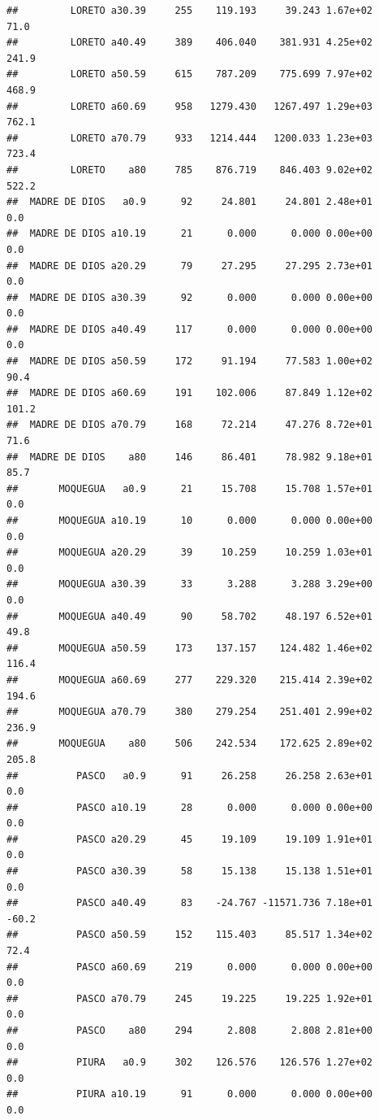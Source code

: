 \documentclass[
]{article}
\begin{document}
\begin{verbatim}
##         LORETO a30.39     255    119.193     39.243 1.67e+02       71.0
##         LORETO a40.49     389    406.040    381.931 4.25e+02      241.9
##         LORETO a50.59     615    787.209    775.699 7.97e+02      468.9
##         LORETO a60.69     958   1279.430   1267.497 1.29e+03      762.1
##         LORETO a70.79     933   1214.444   1200.033 1.23e+03      723.4
##         LORETO    a80     785    876.719    846.403 9.02e+02      522.2
##  MADRE DE DIOS   a0.9      92     24.801     24.801 2.48e+01        0.0
##  MADRE DE DIOS a10.19      21      0.000      0.000 0.00e+00        0.0
##  MADRE DE DIOS a20.29      79     27.295     27.295 2.73e+01        0.0
##  MADRE DE DIOS a30.39      92      0.000      0.000 0.00e+00        0.0
##  MADRE DE DIOS a40.49     117      0.000      0.000 0.00e+00        0.0
##  MADRE DE DIOS a50.59     172     91.194     77.583 1.00e+02       90.4
##  MADRE DE DIOS a60.69     191    102.006     87.849 1.12e+02      101.2
##  MADRE DE DIOS a70.79     168     72.214     47.276 8.72e+01       71.6
##  MADRE DE DIOS    a80     146     86.401     78.982 9.18e+01       85.7
##       MOQUEGUA   a0.9      21     15.708     15.708 1.57e+01        0.0
##       MOQUEGUA a10.19      10      0.000      0.000 0.00e+00        0.0
##       MOQUEGUA a20.29      39     10.259     10.259 1.03e+01        0.0
##       MOQUEGUA a30.39      33      3.288      3.288 3.29e+00        0.0
##       MOQUEGUA a40.49      90     58.702     48.197 6.52e+01       49.8
##       MOQUEGUA a50.59     173    137.157    124.482 1.46e+02      116.4
##       MOQUEGUA a60.69     277    229.320    215.414 2.39e+02      194.6
##       MOQUEGUA a70.79     380    279.254    251.401 2.99e+02      236.9
##       MOQUEGUA    a80     506    242.534    172.625 2.89e+02      205.8
##          PASCO   a0.9      91     26.258     26.258 2.63e+01        0.0
##          PASCO a10.19      28      0.000      0.000 0.00e+00        0.0
##          PASCO a20.29      45     19.109     19.109 1.91e+01        0.0
##          PASCO a30.39      58     15.138     15.138 1.51e+01        0.0
##          PASCO a40.49      83    -24.767 -11571.736 7.18e+01      -60.2
##          PASCO a50.59     152    115.403     85.517 1.34e+02       72.4
##          PASCO a60.69     219      0.000      0.000 0.00e+00        0.0
##          PASCO a70.79     245     19.225     19.225 1.92e+01        0.0
##          PASCO    a80     294      2.808      2.808 2.81e+00        0.0
##          PIURA   a0.9     302    126.576    126.576 1.27e+02        0.0
##          PIURA a10.19      91      0.000      0.000 0.00e+00        0.0

\end{verbatim}
\end{document}
